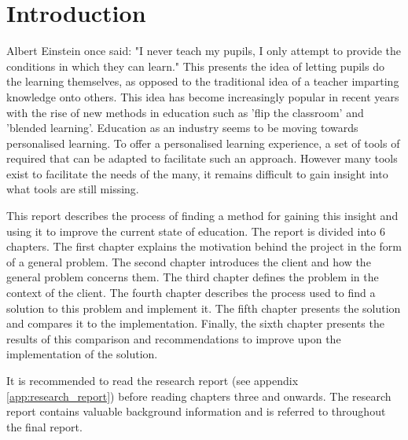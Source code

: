 \chapter{Introduction}

Albert Einstein once said: "I never teach my pupils, I only attempt to provide the conditions in which they can learn." This presents the idea of letting pupils do the learning themselves, as opposed to the traditional idea of a teacher imparting knowledge onto others. This idea has become increasingly popular in recent years with the rise of new methods in education such as 'flip the classroom' and 'blended learning'. Education as an industry seems to be moving towards personalised learning. To offer a personalised learning experience, a set of tools of required that can be adapted to facilitate such an approach. However many tools exist to facilitate the needs of the many, it remains difficult to gain insight into what tools are still missing.

This report describes the process of finding a method for gaining this insight and using it to improve the current state of education. The report is divided into 6 chapters. The first chapter explains the motivation behind the project in the form of a general problem. The second chapter introduces the client and how the general problem concerns them. The third chapter defines the problem in the context of the client. The fourth chapter describes the process used to find a solution to this problem and implement it. The fifth chapter presents the solution and compares it to the implementation. Finally, the sixth chapter presents the results of this comparison and recommendations to improve upon the implementation of the solution.

It is recommended to read the research report (see appendix \ref{app:research_report}) before reading chapters three and onwards. The research report contains valuable background information and is referred to throughout the final report.